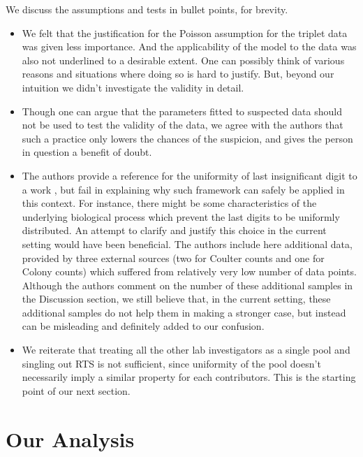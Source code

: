 \documentclass{article}
\begin{document}
We discuss the assumptions and tests in bullet points, for brevity.
\begin{itemize}
    \item We felt that the justification for the Poisson assumption for the triplet data was given less importance. And the applicability of the model to the data was also not underlined to a desirable extent. One can possibly think of various reasons and situations where doing so is hard to justify. But, beyond our intuition we didn't investigate the validity in detail.
    \item Though one can argue that the parameters fitted to suspected data should not be used to test the validity of the data, we agree with the authors that such a practice only lowers the chances of the suspicion, and gives the person in question a benefit of doubt.
    \item The authors provide a reference for the uniformity of last insignificant digit to a work \cite{mosimann2002terminal}, but fail in explaining why such framework can safely be applied in this context. For instance, there
    might be some characteristics of the underlying biological process which
    prevent the last digits to be uniformly distributed. An attempt to
    clarify and justify this choice in the current setting would have been
    beneficial. The authors include here additional data, provided by three
    external sources (two for Coulter counts and one for Colony counts) which suffered from relatively very low number of data points.
    Although the authors comment on the number of these additional samples
    in the Discussion section, we still believe that, in the current
    setting, these additional samples do not help them in making a stronger
    case, but instead can be misleading and definitely added to our confusion.
    \item We reiterate that treating all the other lab
    investigators as a single pool and singling out RTS is not sufficient, since uniformity
    of the pool doesn't necessarily imply a similar property for each contributors. This is the starting point of our next section.

\end{itemize}



    \section{Our Analysis}\label{our-analysis}
\end{document}
